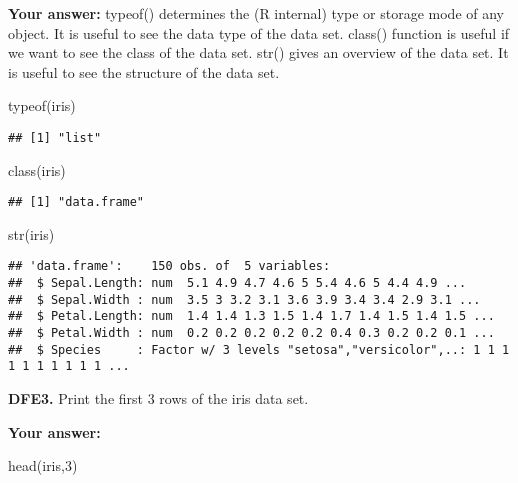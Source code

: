 \documentclass[
]{article}
\newenvironment{Shaded}{\begin{snugshade}}{\end{snugshade}}
\newcommand{\DecValTok}[1]{\textcolor[rgb]{0.00,0.00,0.81}{#1}}
\newcommand{\FunctionTok}[1]{\textcolor[rgb]{0.00,0.00,0.00}{#1}}
\newcommand{\NormalTok}[1]{#1}
\begin{document}
\textbf{Your answer:} typeof() determines the (R internal) type or
storage mode of any object. It is useful to see the data type of the
data set. class() function is useful if we want to see the class of the
data set. str() gives an overview of the data set. It is useful to see
the structure of the data set.

\begin{Shaded}
\begin{Highlighting}[]
\FunctionTok{typeof}\NormalTok{(iris)}
\end{Highlighting}
\end{Shaded}

\begin{verbatim}
## [1] "list"
\end{verbatim}

\begin{Shaded}
\begin{Highlighting}[]
\FunctionTok{class}\NormalTok{(iris)}
\end{Highlighting}
\end{Shaded}

\begin{verbatim}
## [1] "data.frame"
\end{verbatim}

\begin{Shaded}
\begin{Highlighting}[]
\FunctionTok{str}\NormalTok{(iris)}
\end{Highlighting}
\end{Shaded}

\begin{verbatim}
## 'data.frame':    150 obs. of  5 variables:
##  $ Sepal.Length: num  5.1 4.9 4.7 4.6 5 5.4 4.6 5 4.4 4.9 ...
##  $ Sepal.Width : num  3.5 3 3.2 3.1 3.6 3.9 3.4 3.4 2.9 3.1 ...
##  $ Petal.Length: num  1.4 1.4 1.3 1.5 1.4 1.7 1.4 1.5 1.4 1.5 ...
##  $ Petal.Width : num  0.2 0.2 0.2 0.2 0.2 0.4 0.3 0.2 0.2 0.1 ...
##  $ Species     : Factor w/ 3 levels "setosa","versicolor",..: 1 1 1 1 1 1 1 1 1 1 ...
\end{verbatim}

\textbf{DFE3.} Print the first 3 rows of the iris data set.

\textbf{Your answer:}

\begin{Shaded}
\begin{Highlighting}[]
\FunctionTok{head}\NormalTok{(iris,}\DecValTok{3}\NormalTok{)}
\end{Highlighting}
\end{Shaded}
\end{document}
